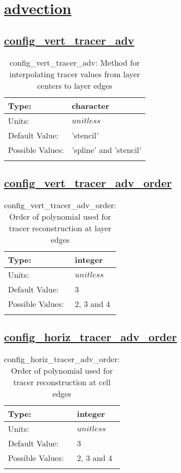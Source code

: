 \section[advection]{\hyperref[sec:nm_tab_advection]{advection}}
\label{sec:nm_sec_advection}
\subsection[config\_vert\_tracer\_adv]{\hyperref[sec:nm_tab_advection]{config\_vert\_tracer\_adv}}
\label{subsec:nm_sec_config_vert_tracer_adv}
\begin{center}
\begin{longtable}{| p{2.0in} | p{4.0in} |}
    \hline
    Type: & character \\
    \hline
    Units: & $unitless$ \\
    \hline
    Default Value: & 'stencil' \\
    \hline
    Possible Values: & 'spline' and 'stencil' \\
    \hline
    \caption{config\_vert\_tracer\_adv: Method for interpolating tracer values from layer centers to layer edges}
\end{longtable}
\end{center}
\subsection[config\_vert\_tracer\_adv\_order]{\hyperref[sec:nm_tab_advection]{config\_vert\_tracer\_adv\_order}}
\label{subsec:nm_sec_config_vert_tracer_adv_order}
\begin{center}
\begin{longtable}{| p{2.0in} | p{4.0in} |}
    \hline
    Type: & integer \\
    \hline
    Units: & $unitless$ \\
    \hline
    Default Value: & 3 \\
    \hline
    Possible Values: & 2, 3 and 4 \\
    \hline
    \caption{config\_vert\_tracer\_adv\_order: Order of polynomial used for tracer reconstruction at layer edges}
\end{longtable}
\end{center}
\subsection[config\_horiz\_tracer\_adv\_order]{\hyperref[sec:nm_tab_advection]{config\_horiz\_tracer\_adv\_order}}
\label{subsec:nm_sec_config_horiz_tracer_adv_order}
\begin{center}
\begin{longtable}{| p{2.0in} | p{4.0in} |}
    \hline
    Type: & integer \\
    \hline
    Units: & $unitless$ \\
    \hline
    Default Value: & 3 \\
    \hline
    Possible Values: & 2, 3 and 4 \\
    \hline
    \caption{config\_horiz\_tracer\_adv\_order: Order of polynomial used for tracer reconstruction at cell edges}
\end{longtable}
\end{center}
